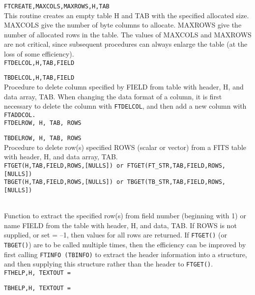 {\tt FTCREATE,MAXCOLS,MAXROWS,H,TAB} \\

	This routine creates an empty table H and TAB with the 
	specified allocated size.  MAXCOLS give the number of
        byte columns to allocate.  MAXROWS give the number of 
        allocated rows in the table.  The values of MAXCOLS and
        MAXROWS are not critical, since subsequent procedures
        can always enlarge the table (at the loss of some 
        efficiency). \\

{\tt FTDELCOL,H,TAB,FIELD} 

{\tt TBDELCOL,H,TAB,FIELD} \\

        Procedure to delete column specified by FIELD from table
        with header, H, and data array, TAB.   When changing the
        data format of a column, it is first necessary to delete
        the column with {\tt FTDELCOL}, and then add a new column with
        {\tt FTADDCOL.}  \\

{\tt FTDELROW, H, TAB, ROWS}  

{\tt TBDELROW, H, TAB, ROWS} \\

        Procedure to delete row(s) specified ROWS (scalar or vector)
        from a FITS table with header, H, and data array, TAB. \\

{\tt FTGET(H,TAB,FIELD,ROWS,[NULLS]) or FTGET(FT\_STR,TAB,FIELD,ROWS,[NULLS])}	\\

{\tt TBGET(H,TAB,FIELD,ROWS,[NULLS]) or TBGET(TB\_STR,TAB,FIELD,ROWS,[NULLS])}   \\\

	Function to extract the specified row(s) from field
	number (beginning with 1) or name FIELD from the 
        table with header, H, and data, TAB.  If ROWS is not 
        supplied, or set = --1, then values for all rows are 
        returned.   If {\tt FTGET()} (or {\tt TBGET()}) are to be called multiple times, then
        the efficiency can be improved by first calling {\tt FTINFO (TBINFO)} to
     extract the header information into a structure, and then supplying this
    structure rather than the header to {\tt FTGET()}.  \\

{\tt FTHELP,H, TEXTOUT = } 

{\tt TBHELP,H, TEXTOUT = } \\

